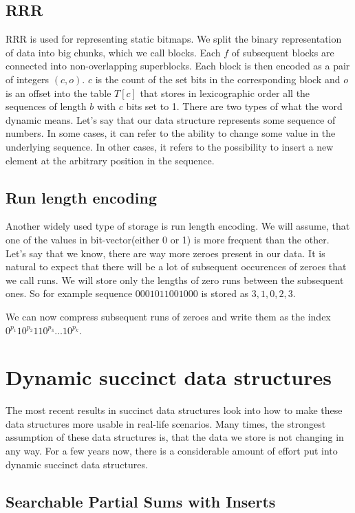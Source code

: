 \subsection{RRR}

RRR is used for representing static bitmaps. We split the binary representation of data into big chunks, which we call blocks.
Each $f$ of subsequent blocks are connected into non-overlapping superblocks. Each block is then encoded as a pair of integers $(c, o)$. $c$
is the count of the set bits in the corresponding block and $o$ is an offset into the table $T[c]$ that stores in lexicographic order all the sequences of
length $b$ with $c$ bits set to 1. There are two types of what the word dynamic means. Let's say that our data structure represents some sequence of numbers.
In some cases, it can refer to the ability to change some value in the underlying sequence. In other cases, it refers to the possibility to insert a new element at the arbitrary
position in the sequence.

\subsection{Run length encoding}

Another widely used type of storage is run length encoding. We will assume, that one of the values in bit-vector(either 0 or 1) is more frequent than the other. Let's say that we know, there are way more zeroes present in our data. It is natural to expect that there will be a lot of subsequent occurences of zeroes that we call runs. We will store only the lengths of zero runs between the subsequent ones. So for example
sequence $0001011001000$ is stored as $3, 1, 0, 2, 3$.

 We can now compress subsequent runs of zeroes and write them as the index $0^{p_1}10^{p_2}110^{p_3}\ldots 10^{p_k}$. 

\section{Dynamic succinct data structures}

The most recent results in succinct data structures look into how to make these data structures more usable in real-life scenarios. Many times, the
strongest assumption of these data structures is, that the data we store is not changing in any way. For a few years now, there is a considerable amount
of effort put into dynamic succinct data structures. 

\subsection{Searchable Partial Sums with Inserts}

